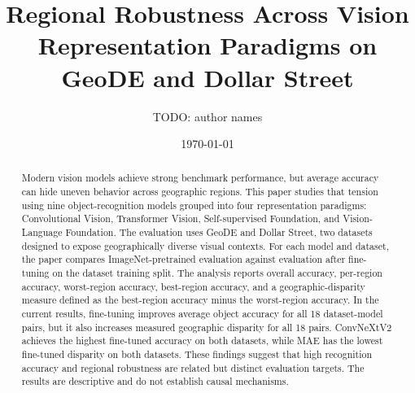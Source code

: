 \documentclass[11pt]{article}
\title{Regional Robustness Across Vision Representation Paradigms on GeoDE and Dollar Street}
\author{TODO: author names}
\date{\today}
\begin{document}
\maketitle

\begin{abstract}
Modern vision models achieve strong benchmark performance, but average accuracy can hide uneven behavior across geographic regions. This paper studies that tension using nine object-recognition models grouped into four representation paradigms: Convolutional Vision, Transformer Vision, Self-supervised Foundation, and Vision-Language Foundation. The evaluation uses GeoDE and Dollar Street, two datasets designed to expose geographically diverse visual contexts. For each model and dataset, the paper compares ImageNet-pretrained evaluation against evaluation after fine-tuning on the dataset training split. The analysis reports overall accuracy, per-region accuracy, worst-region accuracy, best-region accuracy, and a geographic-disparity measure defined as the best-region accuracy minus the worst-region accuracy. In the current results, fine-tuning improves average object accuracy for all 18 dataset-model pairs, but it also increases measured geographic disparity for all 18 pairs. ConvNeXtV2 achieves the highest fine-tuned accuracy on both datasets, while MAE has the lowest fine-tuned disparity on both datasets. These findings suggest that high recognition accuracy and regional robustness are related but distinct evaluation targets. The results are descriptive and do not establish causal mechanisms.
\end{abstract}













\end{document}
